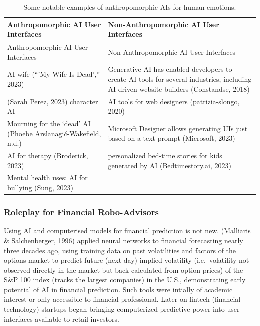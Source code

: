 \documentclass[
  letterpaper,
  DIV=11,
  numbers=noendperiod]{scrartcl}
\begin{document}
\begin{longtable}[]{@{}
  >{\raggedright\arraybackslash}p{}
  >{\raggedright\arraybackslash}p{}@{}}
\caption{Some notable examples of anthropomorphic AIs for human
emotions.}\tabularnewline
\toprule\noalign{}
\begin{minipage}[b]{\linewidth}\raggedright
Anthropomorphic AI User Interfaces
\end{minipage} & \begin{minipage}[b]{\linewidth}\raggedright
Non-Anthropomorphic AI User Interfaces
\end{minipage} \\
\midrule\noalign{}
\endfirsthead
\toprule\noalign{}
\begin{minipage}[b]{\linewidth}\raggedright
Anthropomorphic AI User Interfaces
\end{minipage} & \begin{minipage}[b]{\linewidth}\raggedright
Non-Anthropomorphic AI User Interfaces
\end{minipage} \\
\midrule\noalign{}
\endhead
\bottomrule\noalign{}
\endlastfoot
AI wife ({``'{My} Wife Is Dead',''} 2023) & Generative AI has enabled
developers to create AI tools for several industries, including
AI-driven website builders (Constandse, 2018) \\
(Sarah Perez, 2023) character AI & AI tools for web designers
(patrizia-slongo, 2020) \\
Mourning for the `dead' AI (Phoebe Arslanagić-Wakefield, n.d.) &
Microsoft Designer allows generating UIs just based on a text prompt
(Microsoft, 2023) \\
AI for therapy (Broderick, 2023) & personalized bed-time stories for
kids generated by AI (Bedtimestory.ai, 2023) \\
Mental health uses: AI for bullying (Sung, 2023) & \\
\end{longtable}

\subsubsection{Roleplay for Financial
Robo-Advisors}\label{roleplay-for-financial-robo-advisors}

Using AI and computerised models for financial prediction is not new.
(Malliaris \& Salchenberger, 1996) applied neural networks to financial
forecasting nearly three decades ago, using training data on past
volatilities and factors of the options market to predict future
(next-day) implied volatility (i.e.~volatility not observed directly in
the market but back-calculated from option prices) of the S\&P 100 index
(tracks the largest companies) in the U.S., demonstrating early
potential of AI in financial prediction. Such tools were intially of
academic interest or only accessible to financial professional. Later on
fintech (financial technology) startups began bringing computerized
predictive power into user interfaces available to retail investors.
\end{document}
